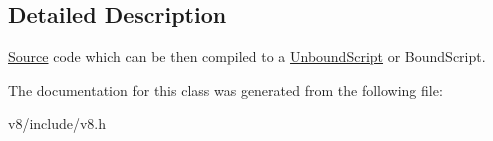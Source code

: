 \subsection{Detailed Description}
\hyperlink{classv8_1_1ScriptCompiler_1_1Source}{Source} code which can be then compiled to a \hyperlink{classv8_1_1UnboundScript}{Unbound\-Script} or Bound\-Script. 

The documentation for this class was generated from the following file\-:\begin{DoxyCompactItemize}
\item 
v8/include/v8.\-h\end{DoxyCompactItemize}
